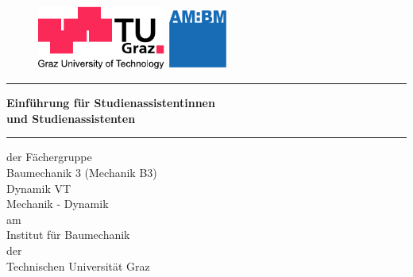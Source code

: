 %
%
\begin{titlepage}
        \begin{figure}[htbp]
        \hspace{.05\linewidth}
            \begin{minipage}[b]{.6\linewidth}
                \includegraphics[width=4.2cm]{coverPics/logo_lang_V8.pdf}
            \end{minipage}
            \hspace{.2\linewidth}
        \begin{minipage}[b]{.2\linewidth}
                \includegraphics[width=2cm]{coverPics/AM_BM.pdf}
        \end{minipage}
        \end{figure}

        \vspace*{3mm}
    \hrule

    \fontsize{16pt}{24pt}\selectfont


\begin{center}
    \vspace{30mm}
        \textsf{\textbf{Einf\"{u}hrung f\"{u}r Studienassistentinnen \\
          und Studienassistenten}}\\
    \normalfont

    \vspace{10mm}
        \hrule
    \vspace{10mm}
    \normalsize{der F\"{a}chergruppe}\\
    \vspace{5mm}
    \Large{Baumechanik 3 (Mechanik B3)}\\
    \Large{Dynamik VT}\\
    \Large{Mechanik - Dynamik}\\ 
    \vspace{5mm}
    \normalsize{am}\\
    \vspace{5mm}
    \Large{Institut f\"{u}r Baumechanik \\ der 
          \\ Technischen Universit\"{a}t Graz} \\


\end{center}
\end{titlepage}
